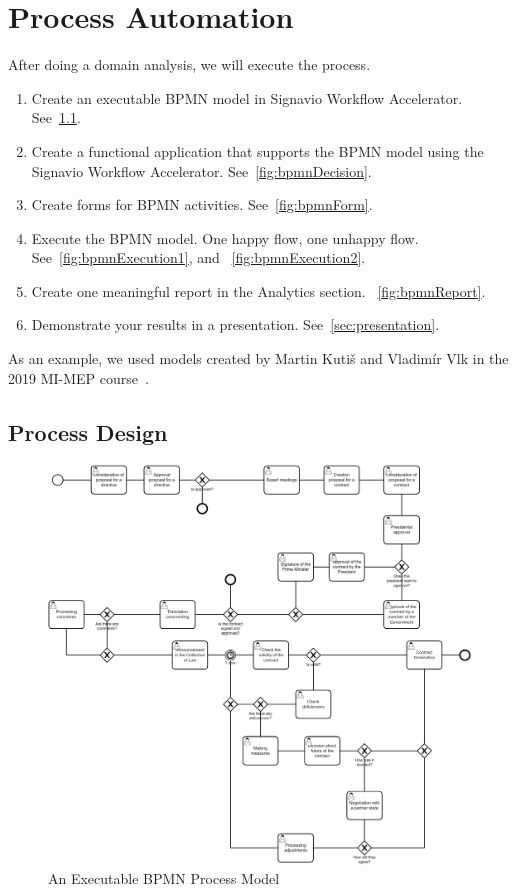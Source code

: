 \chapter{Process Automation}

After doing a domain analysis, we will execute the process. 

\begin{enumerate}
    \item Create an executable BPMN model in Signavio Workflow Accelerator. See~\cref{fig:bpmnModel}. 
    \item Create a functional application that supports the BPMN model using the Signavio Workflow Accelerator. See~\cref{fig:bpmnDecision}. 
    \item Create forms for BPMN activities. See~\cref{fig:bpmnForm}. 
    \item Execute the BPMN model. One happy flow, one unhappy flow. See~\cref{fig:bpmnExecution1}, and ~\cref{fig:bpmnExecution2}. 
    \item Create one meaningful report in the Analytics section. ~\cref{fig:bpmnReport}. 
    \item Demonstrate your results in a presentation. See~\cref{sec:presentation}. 
\end{enumerate}

As an example, we used models created by Martin Kutiš and Vladimír Vlk in the 2019 MI-MEP course~\cite{kutisvlk2019}. 

\section{Process Design}

\begin{figure}[h]\centering
	\includegraphics[width=\textwidth]{pic/BPMNModel}
	\caption{An Executable BPMN Process Model~\cite{kutisvlk2019}}
	\label{fig:bpmnModel}
\end{figure}

